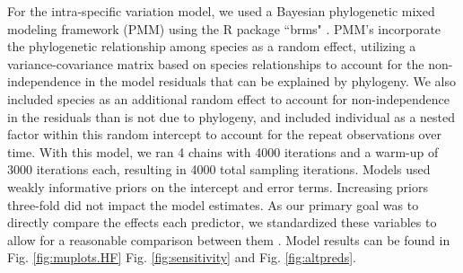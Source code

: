 \documentclass[11pt]{article}\usepackage[]{graphicx}\usepackage[]{color}
\begin{document}
For the intra-specific variation model, we used a Bayesian phylogenetic mixed modeling framework (PMM) \citep{Garamszegi2014} using the R package ``brms" \citep{Burkner2018}. PMM's incorporate the phylogenetic relationship among species as a random effect, utilizing a variance-covariance matrix based on species relationships to account for the non-independence in the model residuals that can be explained by phylogeny. We also included species as an additional random effect to account for non-independence in the residuals than is not due to phylogeny, and included individual as a nested factor within this random intercept to account for the repeat observations over time. With this model, we ran 4 chains with 4000 iterations and a warm-up of 3000 iterations each, resulting in 4000 total sampling iterations. Models used weakly informative priors on the intercept and error terms. Increasing priors three-fold did not impact the model estimates. As our primary goal was to directly compare the effects each predictor, we standardized these variables to allow for a reasonable comparison between them {\citep{Gelman2007}. Model results can be found in Fig. \ref{fig:muplots.HF} Fig. \ref{fig:sensitivity} and Fig. \ref{fig:altpreds}.\\

%
%
%
%

}
\end{document}
